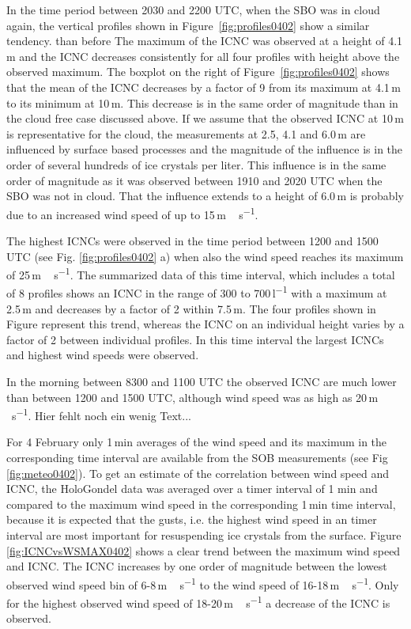 \documentclass[draft,linenumbers]{agujournal}
\begin{document}
In the time period between 2030 and 2200 UTC, when the SBO was in cloud again, the vertical profiles shown in Figure \,\ref{fig:profiles0402} show a similar tendency. than before The maximum of the ICNC was observed at a height of 4.1\,\si{m} and the ICNC decreases consistently for all four profiles with height above the observed maximum. The boxplot on the right of Figure \,\ref{fig:profiles0402} shows that the mean of the ICNC decreases by a factor of 9 from its maximum at 4.1\,\si{m} to its minimum at 10\,\si{m}. This decrease is in the same order of magnitude than in the cloud free case discussed above. If we assume that the observed ICNC at 10\,\si{m} is representative for the cloud, the measurements at 2.5, 4.1 and 6.0\,\si{m} are influenced by surface based processes and the magnitude of the influence is in the order of several hundreds of ice crystals per liter. This influence is in the same order of magnitude as it was observed between 1910 and 2020 UTC when the SBO was not in cloud. That the influence extends to a height of 6.0\,\si{m} is probably due to an increased wind speed of up to 15\,\si{m\,s^{-1}}. 

The highest ICNCs were observed in the time period between 1200 and 1500 UTC (see Fig. \ref{fig:profiles0402} a) when also the wind speed reaches its maximum of 25\,\si{m\,s^{-1}}. The summarized data of this time interval, which includes a total of 8 profiles shows an ICNC in the range of 300 to 700\,\si{l^{-1}} with a maximum at 2.5\,\si{m} and decreases by a factor of 2 within 7.5\,\si{m}. The four profiles shown in Figure represent this trend, whereas the ICNC on an individual height varies by a factor of 2 between individual profiles. In this time interval the largest ICNCs and highest wind speeds were observed.

In the morning between 8300 and 1100 UTC the observed ICNC are much lower than between 1200 and 1500 UTC, although wind speed was as high as 20\,\si{m\,s^{-1}}. Hier fehlt noch ein wenig Text...

For 4 February only 1\,\si{min} averages of the wind speed and its maximum in the corresponding time interval are available from the SOB measurements (see Fig \ref{fig:meteo0402}). To get an estimate of the correlation between wind speed and ICNC, the HoloGondel data was averaged over a timer interval of 1 min and compared to the maximum wind speed in the corresponding 1\,\si{min} time interval, because it is expected that the gusts, i.e. the highest wind speed in an timer interval are most important for resuspending ice crystals from the surface. Figure \ref{fig:ICNCvsWSMAX0402} shows a clear trend between the maximum wind speed and ICNC. The ICNC increases by one order of magnitude between the lowest observed wind speed bin of 6-8\,\si{m\,s^{-1}} to the wind speed of 16-18\,\si{m\,s^{-1}}. Only for the highest observed wind speed of 18-20\,\si{m\,s^{-1}} a decrease of the ICNC is observed.
\end{document}
